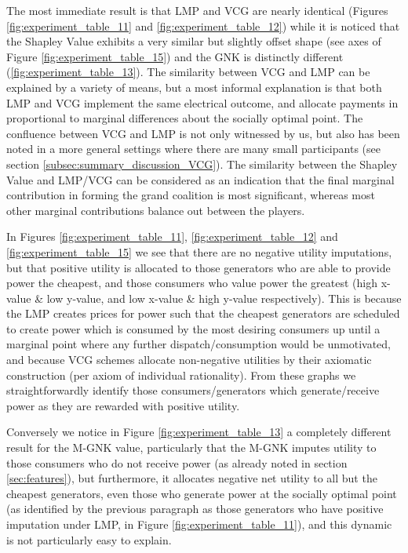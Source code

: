 The most immediate result is that LMP and VCG are nearly identical (Figures \ref{fig:experiment_table_11} and \ref{fig:experiment_table_12}) while it is noticed that the Shapley Value exhibits a very similar but slightly offset shape (see axes of Figure \ref{fig:experiment_table_15}) and the GNK is distinctly different (\ref{fig:experiment_table_13}).
The similarity between VCG and LMP can be explained by a variety of means, but a most informal explanation is that both LMP and VCG implement the same electrical outcome, and allocate payments in proportional to marginal differences about the socially optimal point.
The confluence between VCG and LMP is not only witnessed by us, but also has been noted in a more general settings where there are many small participants \citep{NATH2019673, 8430852} (see section \ref{subsec:summary_discussion_VCG}).%
The similarity between the Shapley Value and LMP/VCG can be considered as an indication that the final marginal contribution in forming the grand coalition is most significant, whereas most other marginal contributions balance out between the players.

In Figures \ref{fig:experiment_table_11}, \ref{fig:experiment_table_12} and \ref{fig:experiment_table_15} we see that there are no negative utility imputations, but that positive utility is allocated to those generators who are able to provide power the cheapest, and those consumers who value power the greatest (high x-value \& low y-value, and low x-value \& high y-value respectively).
This is because the LMP creates prices for power such that the cheapest generators are scheduled to create power which is consumed by the most desiring consumers up until a marginal point where any further dispatch/consumption would be unmotivated, and because VCG schemes allocate non-negative utilities by their axiomatic construction (per axiom of individual rationality).
From these graphs we straightforwardly identify those consumers/generators which generate/receive power as they are rewarded with positive utility.

Conversely we notice in Figure \ref{fig:experiment_table_13} a completely different result for the M-GNK value, particularly that the M-GNK imputes utility to those consumers who do not receive power (as already noted in section \ref{sec:features}), but furthermore, it allocates negative net utility to all but the cheapest generators, even those who generate power at the socially optimal point (as identified by the previous paragraph as those generators who have positive imputation under LMP, in Figure \ref{fig:experiment_table_11}), and this dynamic is not particularly easy to explain.

